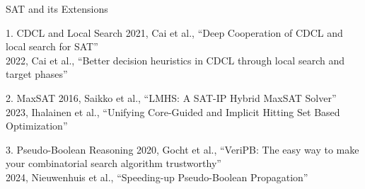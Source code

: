 \documentclass[de]{sdqbeamer}
\begin{document}
\begin{frame}{SAT and its Extensions}
	\begin{exampleblock}{1. CDCL and Local Search}
		2021, Cai et al., “Deep Cooperation of CDCL and local search for SAT”\\
		2022, Cai et al., “Better decision heuristics in CDCL through local search and target phases”\\
	\end{exampleblock}
	\begin{exampleblock}{2. MaxSAT}
		2016, Saikko et al., “LMHS: A SAT-IP Hybrid MaxSAT Solver”\\
		2023, Ihalainen et al., “Unifying Core-Guided and Implicit Hitting Set Based Optimization”		
	\end{exampleblock}
	\begin{exampleblock}{3. Pseudo-Boolean Reasoning}
		2020, Gocht et al., “VeriPB: The easy way to make your combinatorial search algorithm trustworthy”\\
		2024, Nieuwenhuis et al., “Speeding-up Pseudo-Boolean Propagation”
	\end{exampleblock}
\end{frame}

\end{document}
